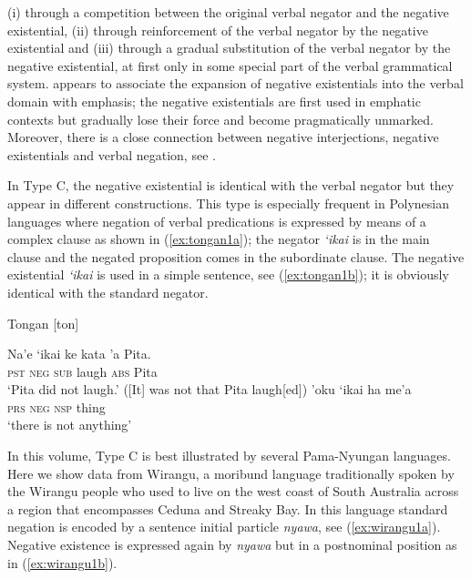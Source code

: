 \documentclass[output=paper,chinesefont,colorlinks,citecolor=brown]{langscibook}
\begin{document}
(i) through a competition between the original verbal negator and the negative existential,
(ii) through reinforcement of the verbal negator by the negative existential and
(iii) through a gradual substitution of the verbal negator by the negative existential, at first only in some special part of the verbal grammatical system. \citet{Croft1991} appears to associate the expansion of negative existentials into the verbal domain with emphasis; the negative existentials are first used in emphatic contexts but gradually lose their force and become pragmatically unmarked. Moreover, there is a close connection between negative interjections, negative existentials and verbal negation, see \citep[8--11; 13--14]{Croft1991}.

In Type C, the negative existential is identical with the verbal negator but they appear in different constructions. This type is especially frequent in Polynesian languages where negation of verbal predications is expressed by means of a complex clause as shown in (\ref{ex:tongan1a}); the negator \textit{‘ikai} is in the main clause and the negated proposition comes in the subordinate clause. The negative existential \textit{‘ikai} is used in a simple sentence, see (\ref{ex:tongan1b}); it is obviously identical with the standard negator.

\newpage
\begin{exe}
\ex Tongan [ton] \citep[97, 104]{Broschart1999}\label{ex:tongan1}
\begin{xlist}
\ex \label{ex:tongan1a}
\gll Na'e ‘ikai ke kata 'a Pita.\\
\textsc{pst} \textsc{neg} \textsc{sub} laugh \textsc{abs} Pita\\
\glt `Pita did not laugh.' ([It] was not that Pita laugh[ed])
\ex \label{ex:tongan1b}
\gll 'oku ‘ikai ha me'a\\
\textsc{prs} \textsc{neg} \textsc{nsp} thing\\
\glt `there is not anything'
\end{xlist}
\end{exe}
In this volume, Type  C is best illustrated by several Pama-Nyungan languages. Here we show data from Wirangu, a moribund language traditionally spoken by the Wirangu people who used to live on the west coast of South Australia across a region that encompasses Ceduna and Streaky Bay. In this language standard negation is encoded by a sentence initial particle \textit{nyawa}, see (\ref{ex:wirangu1a}). Negative existence is expressed again by \textit{nyawa} but in a postnominal position as in (\ref{ex:wirangu1b}).
\end{document}
